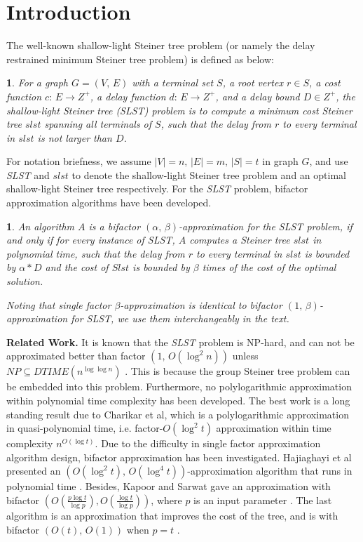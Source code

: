 \documentclass[english,runningheads,a4paper]{llncs}
\newtheorem{defn}[thm]{\protect\definitionname}
\providecommand{\definitionname}{Definition}
\begin{document}
\section{Introduction}

The well-known shallow-light Steiner tree problem (or namely the delay
restrained minimum Steiner tree problem) is defined as below:
\begin{defn}
For a graph $G=(V,\, E)$ with a terminal set $S$, a root vertex
$r\in S$, a cost function $c:\, E\rightarrow Z^{+}$, a delay function
$d:\, E\rightarrow Z^{+}$, and a delay bound $D\in Z^{+}$, the\emph{
shallow-light Steiner tree (SLST) problem} is to compute a minimum
cost Steiner tree $slst$ spanning all terminals of $S$, such that
the delay from $r$ to every terminal in $slst$ is not larger than
$D$.
\end{defn}
For notation briefness, we assume $|V|=n,\,|E|=m,\,|S|=t$ in graph
$G$, and use \emph{SLST }and\emph{ $slst$} to denote the shallow-light
Steiner tree problem and an optimal shallow-light Steiner tree respectively.
 For the \emph{SLST} problem, bifactor approximation algorithms have
been developed.
\begin{defn}
An algorithm $A$ is a bifactor $\left(\alpha,\,\beta\right)$-approximation
for the \emph{SLST} problem, if and only if for every instance of
\emph{SLST, $A$} computes a Steiner tree $slst$ in polynomial time,
such that the delay from $r$ to every terminal in $slst$ is bounded
by $\alpha*D$ and the cost of $Slst$ is bounded by $\beta$ times
of the cost of the optimal solution.

Noting that single factor $\beta$-approximation is identical to bifactor
$\left(1,\,\beta\right)$-approximation for \emph{SLST}, we use them
interchangeably in the text.
\end{defn}
\textbf{Related Work.} It is known that the \emph{SLST} problem is
NP-hard, and can not be approximated better than factor $(1,\, O(\log^{2}n))$
unless $NP\subseteq DTIME(n^{\log\log n})$ \cite{khandekar2013some}.
This is because the group Steiner tree problem can be embedded into
this problem. Furthermore, no polylogarithmic approximation within
polynomial time complexity has been developed. The best work is a
long standing result due to Charikar et al, which is a polylogarithmic
approximation in quasi-polynomial time, i.e. factor-$O(\log^{2}t)$
approximation within time complexity $n^{O(\log t)}$\cite{charikar1998approximation}.
Due to the difficulty in single factor approximation algorithm design,
bifactor approximation has been investigated. Hajiaghayi et al presented
an $(O(\log^{2}t),\, O(\log^{4}t))$-approximation algorithm that
runs in polynomial time \cite{hajiaghayi2006approximating}. Besides,
Kapoor and Sarwat gave an approximation with bifactor $(O(\frac{p\log t}{\log p}),O(\frac{\log t}{\log p}))$,
where $p$ is an input parameter \cite{kapoor2007bounded}. The last
algorithm is an approximation that improves the cost of the tree,
and is with bifactor $(O(t),\, O(1))$ when $p=t$ \cite{kapoor2007bounded}.
\end{document}
